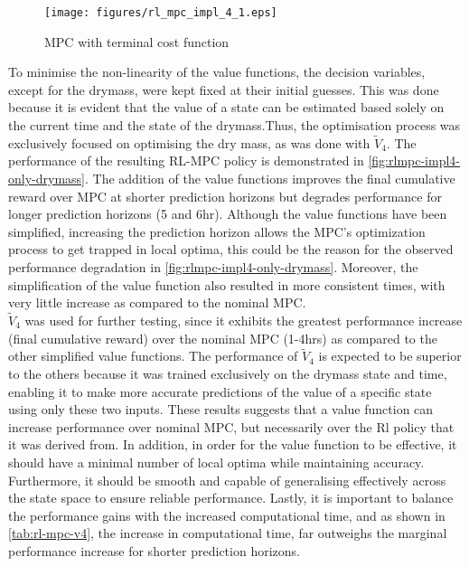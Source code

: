 \begin{figure}[H]
	\centering
	\texttt{[image: figures/rl\_mpc\_impl\_4\_1.eps]}
	\caption{MPC with terminal cost function}
	\label{fig:rlmpc-impl4-only-drymass}
\end{figure}
To minimise the non-linearity of the value functions, the decision variables, except for the drymass, were kept fixed at their initial guesses. This was done because it is evident that the value of a state can be estimated based solely on the current time and the state of the drymass.Thus, the optimisation process was exclusively focused on optimising the dry mass, as was  done with $\tilde{V}_4$. The performance of the resulting RL-MPC policy is demonstrated in \autoref{fig:rlmpc-impl4-only-drymass}. The addition of the value functions improves the final cumulative reward over MPC at shorter prediction horizons but degrades performance for longer prediction horizons (5 and 6hr). Although the value functions have been simplified, increasing the prediction horizon allows the MPC's optimization process to get trapped in local optima, this could be the reason for the observed performance degradation in \autoref{fig:rlmpc-impl4-only-drymass}. Moreover, the simplification of the value function also resulted in more consistent times, with very little increase as compared to the nominal MPC.\\

$\tilde{V}_4$ was used for further testing, since it exhibits the greatest performance increase (final cumulative reward) over the nominal MPC (1-4hrs) as compared to the other simplified value functions. The performance of $\tilde{V}_4$ is expected to be superior to the others because it was trained exclusively on the drymass state and time, enabling it to make more accurate predictions of the value of a specific state using only these two inputs. These results suggests that a value function can increase performance over nominal MPC, but necessarily over the Rl policy that it was derived from. In addition, in order for the value function to be effective, it should have a minimal number of local optima while maintaining accuracy. Furthermore, it should be smooth and capable of generalising effectively across the state space to ensure reliable performance. Lastly, it is important to balance the performance gains with the increased computational time, and as shown in \autoref{tab:rl-mpc-v4}, the increase in computational time, far outweighs the marginal performance increase for shorter prediction horizons.

